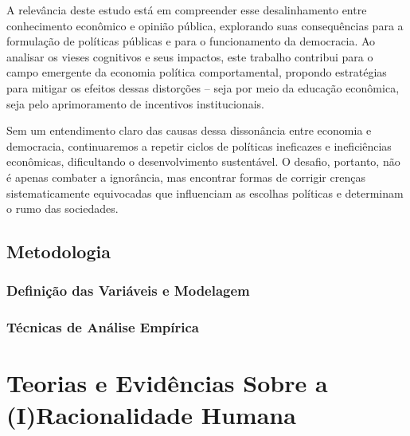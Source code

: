 A relevância deste estudo está em compreender esse desalinhamento entre conhecimento econômico e opinião pública, explorando suas consequências para a formulação de políticas públicas e para o funcionamento da democracia. Ao analisar os vieses cognitivos e seus impactos, este trabalho contribui para o campo emergente da economia política comportamental, propondo estratégias para mitigar os efeitos dessas distorções – seja por meio da educação econômica, seja pelo aprimoramento de incentivos institucionais.

Sem um entendimento claro das causas dessa dissonância entre economia e democracia, continuaremos a repetir ciclos de políticas ineficazes e ineficiências econômicas, dificultando o desenvolvimento sustentável. O desafio, portanto, não é apenas combater a ignorância, mas encontrar formas de corrigir crenças sistematicamente equivocadas que influenciam as escolhas políticas e determinam o rumo das sociedades.


\section{Metodologia} %


\subsection{Definição das Variáveis e Modelagem} %


\subsection{Técnicas de Análise Empírica} %



\chapter{Teorias e Evidências Sobre a (I)Racionalidade Humana} %


